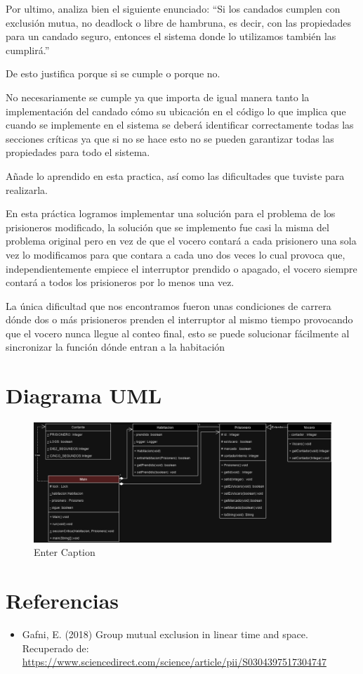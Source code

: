 \documentclass[10pt,letterpaper]{article}
\begin{document}
Por ultimo, analiza bien el siguiente enunciado:
“Si los candados cumplen con exclusión mutua, no deadlock o libre de hambruna, es decir, con las propiedades para un candado seguro, entonces el sistema donde lo utilizamos también las cumplirá.”

De esto justifica porque si se cumple o porque no.

No necesariamente se cumple ya que importa de igual manera tanto la implementación del candado cómo su ubicación en el código lo que implica que cuando se implemente en el sistema se deberá identificar correctamente todas las secciones críticas ya que si no se hace esto no se pueden garantizar todas las propiedades para todo el sistema.


\hspace{3mm}

Añade lo aprendido en esta practica, así como las dificultades que tuviste para realizarla.

En esta práctica logramos implementar una solución para el problema de los prisioneros modificado, la solución que se implemento fue casi la misma del problema original pero en vez de que el vocero contará a cada prisionero una sola vez lo modificamos para que contara a cada uno dos veces lo cual provoca que, independientemente empiece el interruptor prendido o apagado, el vocero siempre contará a todos los prisioneros por lo menos una vez.

La única dificultad que nos encontramos fueron unas condiciones de carrera dónde dos o más prisioneros prenden el interruptor al mismo tiempo provocando que el vocero nunca llegue al conteo final, esto se puede solucionar fácilmente al sincronizar la función dónde entran a la habitación

\section*{Diagrama UML}
\begin{figure}[H]
    \centering
    \includegraphics[width=0.7\linewidth]{P03//IMG/diagrama_P3.png}
    \caption{Enter Caption}
    \label{fig:enter-label}
\end{figure}
\section*{Referencias}
\begin{itemize}
    \item Gafni, E. (2018) Group mutual exclusion in linear time and space. Recuperado de: \url{https://www.sciencedirect.com/science/article/pii/S0304397517304747}
\end{itemize}
\end{document}
